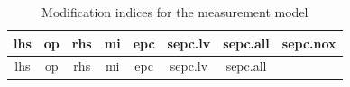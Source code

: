 \documentclass[]{article}
\begin{document}
\begin{longtable}[]{@{}cccccccc@{}}
\caption{Modification indices for the measurement model}\tabularnewline
\toprule
\begin{minipage}[b]{0.07\columnwidth}\centering
lhs\strut
\end{minipage} & \begin{minipage}[b]{0.05\columnwidth}\centering
op\strut
\end{minipage} & \begin{minipage}[b]{0.07\columnwidth}\centering
rhs\strut
\end{minipage} & \begin{minipage}[b]{0.09\columnwidth}\centering
mi\strut
\end{minipage} & \begin{minipage}[b]{0.11\columnwidth}\centering
epc\strut
\end{minipage} & \begin{minipage}[b]{0.11\columnwidth}\centering
sepc.lv\strut
\end{minipage} & \begin{minipage}[b]{0.12\columnwidth}\centering
sepc.all\strut
\end{minipage} & \begin{minipage}[b]{0.12\columnwidth}\centering
sepc.nox\strut
\end{minipage}\tabularnewline
\midrule
\endfirsthead
\toprule
\begin{minipage}[b]{0.07\columnwidth}\centering
lhs\strut
\end{minipage} & \begin{minipage}[b]{0.05\columnwidth}\centering
op\strut
\end{minipage} & \begin{minipage}[b]{0.07\columnwidth}\centering
rhs\strut
\end{minipage} & \begin{minipage}[b]{0.09\columnwidth}\centering
mi\strut
\end{minipage} & \begin{minipage}[b]{0.11\columnwidth}\centering
epc\strut
\end{minipage} & \begin{minipage}[b]{0.11\columnwidth}\centering
sepc.lv\strut
\end{minipage} & \begin{minipage}[b]{0.12\columnwidth}\centering
sepc.all\strut
\end{minipage} & \begin{minipage}[b]{0.12\columnwidth}\centering

\end{minipage}
\end{longtable}
\end{document}
